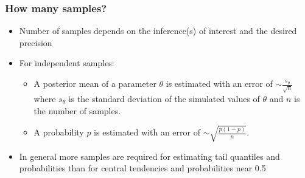 \documentclass{beamer}
\begin{document}
\begin{frame}
  \frametitle{How many samples?}
  
\begin{itemize}
\item Number of samples depends on the inference(s) of interest and the desired precision
\item For independent samples:
\begin{itemize}
\item A posterior mean of a parameter $\theta$ is estimated with an error of $\sim \frac{s_\theta}{\sqrt{n}}$ where $s_\theta$ is the standard deviation of the simulated values of $\theta$ and $n$ is the number of samples.
\item A probability $p$ is estimated with an error of $\sim \sqrt{\frac{p(1-p)}{n}}$.
\end{itemize}
\item In general more samples are required for estimating tail quantiles and probabilities than for central tendencies and probabilities near 0.5
\end{itemize}

\end{frame}
\end{document}
